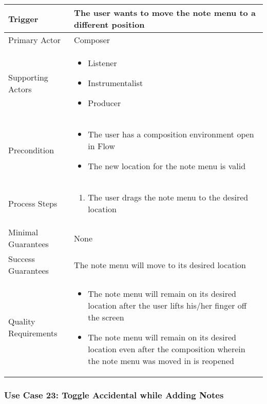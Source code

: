 \begin{tabularx}{\textwidth}{|X|X|}
\hline
Trigger & 
The user wants to move the note menu to a different position\\
\hline
Primary Actor & 
Composer \\
\hline
Supporting Actors & 
\begin{itemize}
\item Listener
\item Instrumentalist
\item Producer
\end{itemize} \\
\hline
Precondition & 
\begin{itemize}
\item The user has a composition environment open in Flow
\item The new location for the note menu is valid
\end{itemize} \\
\hline
Process Steps & 
\begin{enumerate}
\item The user drags the note menu to the desired location
\end{enumerate} \\
\hline
Minimal Guarantees & 
None \\
\hline
Success Guarantees & 
The note menu will move to its desired location\\
\hline
Quality Requirements & 
\begin{itemize}
\item The note menu will remain on its desired location after the user lifts his/her finger off the screen
\item The note menu will remain on its desired location even after the composition wherein the note menu was moved in is reopened
\end{itemize} \\ 
\hline
\end{tabularx}

\subsubsection{Use Case 23: Toggle Accidental while Adding Notes}

